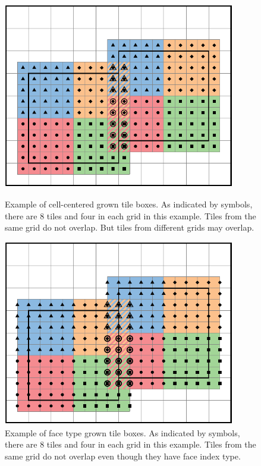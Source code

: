 {{{\begin{figure}[t]
  \centering
  \begin{minipage}{0.45\textwidth}
    \centering
    \includegraphics[width=0.9\textwidth]{./Basics/cc_growbox.pdf}
    \caption{\label{fig:basics:cc_growbox} Example of cell-centered
      grown tile boxes. As indicated by symbols, there are 8 tiles and
      four in each grid in this example. Tiles from the same grid do
      not overlap.  But tiles from different grids may overlap.}
  \end{minipage}\hfill
  \begin{minipage}{0.45\textwidth}
    \centering
    \includegraphics[width=0.9\textwidth]{./Basics/ec_growbox.pdf}
    \caption{\label{fig:basics:ec_growbox} Example of face type grown
      tile boxes.   As indicated by symbols, there are 8 tiles and
      four in each grid in this example. Tiles from the same grid do
      not overlap even though they have face index type. }
  \end{minipage}
\end{figure}

}}}
